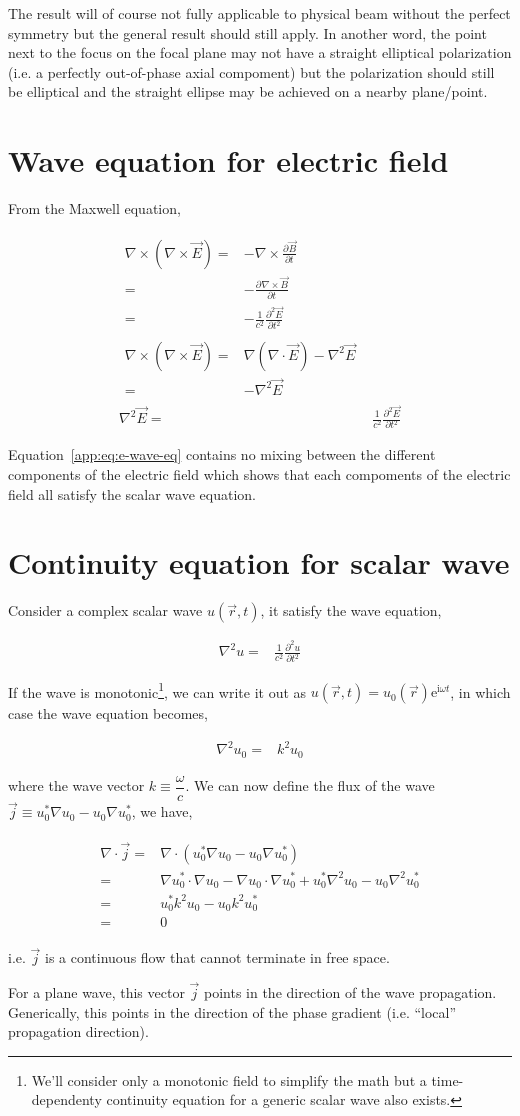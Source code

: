 \documentclass[10pt,fleqn]{article}
\newcommand{\ue}{\mathrm{e}}
\newcommand{\ui}{\mathrm{i}}
\newcommand{\eqar}[1]
{
  \begin{align}
    #1
  \end{align}
}
\newcommand{\paren}[1]{{\left({#1}\right)}}
\newcommand{\pdiff}[3][{}]{{\frac{\partial^{#1} {#2}}{\partial {#3}{}^{#1}}}}
\begin{document}
The result will of course not fully applicable to physical beam
without the perfect symmetry but the general result should still apply.
In another word, the point next to the focus on the focal plane may not have
a straight elliptical polarization (i.e. a perfectly out-of-phase axial compoment)
but the polarization should still be elliptical and the straight ellipse
may be achieved on a nearby plane/point.

\clearpage
\appendix
\section{Wave equation for electric field}
\label{app:wave-eq}
From the Maxwell equation,
\eqar{
  \begin{split}
    \nabla\times\paren{\nabla\times\vec E}=&-\nabla\times\pdiff{\vec B}{t}\\
    =&-\pdiff{\nabla\times\vec B}{t}\\
    =&-\frac{1}{c^2}\pdiff[2]{\vec E}{t}
  \end{split}\\
  \begin{split}
    \nabla\times\paren{\nabla\times\vec E}
    =&\nabla\paren{\nabla\cdot\vec E}-\nabla^2\vec E\\
    =&-\nabla^2\vec E
  \end{split}\\
  \nabla^2\vec E=&\frac{1}{c^2}\pdiff[2]{\vec E}{t}\label{app:eq:e-wave-eq}
}
Equation~\ref{app:eq:e-wave-eq} contains no mixing between the different components
of the electric field which shows that each compoments of the electric field
all satisfy the scalar wave equation.

\section{Continuity equation for scalar wave}
\label{app:wave-flux}
Consider a complex scalar wave $u(\vec r, t)$, it satisfy the wave equation,
\eqar{
  \nabla^2u=&\frac{1}{c^2}\pdiff[2]{u}{t}
}
If the wave is monotonic\footnote{
  We'll consider only a monotonic field to simplify the math but a time-dependenty
  continuity equation for a generic scalar wave also exists.},
we can write it out as $u(\vec r, t)=u_0(\vec r)\ue^{\ui\omega t}$,
in which case the wave equation becomes,
\eqar{
  \nabla^2u_0=&k^2 u_0
}
where the wave vector $k\equiv\dfrac{\omega}{c}$.
We can now define the flux of the wave $\vec j\equiv u_0^*\nabla u_0-u_0\nabla u_0^*$,
we have,
\eqar{
  \begin{split}
    \nabla\cdot\vec j=&\nabla\cdot\paren{u_0^*\nabla u_0-u_0\nabla u_0^*}\\
    =&\nabla u_0^*\cdot\nabla u_0-\nabla u_0\cdot\nabla u_0^*+u_0^*\nabla^2 u_0-u_0\nabla^2 u_0^*\\
    =&u_0^*k^2 u_0-u_0k^2 u_0^*\\
    =&0
  \end{split}
}
i.e. $\vec j$ is a continuous flow that cannot terminate in free space.

For a plane wave, this vector $\vec j$ points in the direction of the wave propagation.
Generically, this points in the direction of the phase gradient
(i.e. ``local'' propagation direction).
\end{document}
